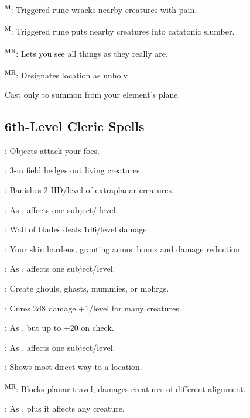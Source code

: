 \textsuperscript{M}: Triggered rune wracks nearby creatures with pain.

\textsuperscript{M}: Triggered rune puts nearby creatures into catatonic slumber.

\textsuperscript{MR}: Lets you see all things as they really are.

\textsuperscript{MR}: Designates location as unholy.


 Cast only to summon from your element's plane.


\subsection{6th-Level Cleric Spells}

: Objects attack your foes.

: 3-m field hedges out living creatures.

: Banishes 2 HD/level of extraplanar creatures.

: As , affects one subject/ level.

: Wall of blades deals 1d6/level damage.

: Your skin hardens, granting armor bonus and damage reduction. %

: As , affects one subject/level.

: Create ghouls, ghasts, mummies, or mohrgs.

: Cures 2d8 damage +1/level for many creatures.

: As , but up to +20 on check.

: As , affects one subject/level.

: Shows most direct way to a location.

\textsuperscript{MR}: Blocks planar travel, damages creatures of different alignment.

: As , plus it affects any creature.

